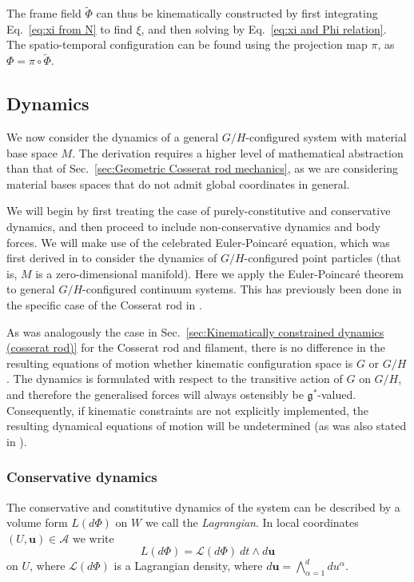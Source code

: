 The frame field $\tilde{\Phi}$ can thus be kinematically constructed by first integrating Eq.~\ref{eq:xi from N} to find $\xi$, and then solving by Eq.~\ref{eq:xi and Phi relation}. The spatio-temporal configuration can be found using the projection map $\pi$, as $\Phi = \pi \circ \tilde{\Phi}$.

\subsection{Dynamics} \label{sec:Geometric dynamics}

We now consider the dynamics of a general $G/H$-configured system with material base space $M$. The derivation requires a higher level of mathematical abstraction than that of Sec.~\ref{sec:Geometric Cosserat rod mechanics}, as we are considering material bases spaces that do not admit global coordinates in general.

We will begin by first treating the case of purely-constitutive and conservative dynamics, and then proceed to include non-conservative dynamics and body forces. We will make use of the celebrated Euler-Poincaré equation, which was first derived in \citep{marleHenriPoincareNote2013, poincareFormeNouvelleEquations1901} to consider the dynamics of $G/H$-configured point particles (that is, $M$ is a zero-dimensional manifold). Here we apply the Euler-Poincaré theorem to general $G/H$-configured continuum systems. This has previously been done in the specific case of the Cosserat rod in \citep{giusteriSimulationViscoelasticCosserat2021}.

As was analogously the case in Sec.~\ref{sec:Kinematically constrained dynamics (cosserat rod)} for the Cosserat rod and filament, there is no difference in the resulting equations of motion whether kinematic configuration space is $G$ or $G/H$. The dynamics is formulated with respect to the transitive action of $G$ on $G/H$, and therefore the generalised forces will always ostensibly be $\mathfrak{g}^*$-valued. Consequently, if kinematic constraints are not explicitly implemented, the resulting dynamical equations of motion will be undetermined (as was also stated in \citep{marleHenriPoincareNote2013, poincareFormeNouvelleEquations1901}).

\subsubsection*{Conservative dynamics}

The conservative and constitutive dynamics of the system can be described by a volume form $L(d\Phi)$ on $W$ we call the \textit{Lagrangian}. In local coordinates $(U, \mathbf{u}) \in \mathcal{A}$ we write
\begin{equation} \label{eq:L volume form}
L(d \Phi) = \mathcal{L}(d \Phi)\ dt \wedge d \mathbf{u}
\end{equation}
on $U$, where $\mathcal{L}(d \Phi)$ is a Lagrangian density, where  $d \mathbf{u} = \bigwedge_{\alpha = 1}^d d u^\alpha$.

